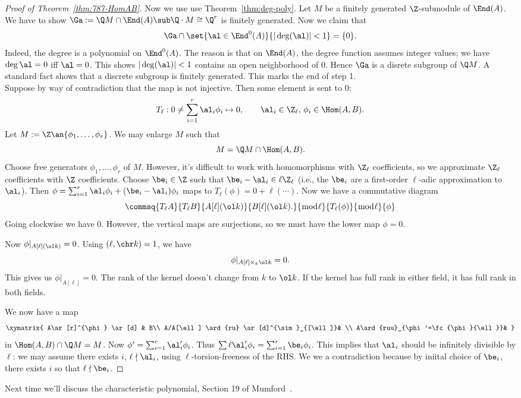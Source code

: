 \begin{proof}[Proof of Theorem~\ref{thm:787-HomAB}]
Now we use use Theorem~\ref{thm:deg-poly}. Let $M$ be a finitely generated $\Z$-submodule of $\End(A)$.  We have to show $\Ga:=\Q M\cap \End (A)\sub \Q\cdot M\cong \Q^r$ is finitely generated. Now we claim that 
\[
\Ga\cap \set{\al\in \End^0(A)}{|\deg(\al)|<1}=\{0\}.
\]
Indeed, the degree is a polynomial on $\End^0(A)$. The reason is that on $\End(A)$, the degree function assumes integer values; %
we have $\deg \al=0$ iff $\al=0$. This shows $|\deg(\al)|<1$ contains an open neighborhood of 0. Hence $\Ga$ is a disrete subgroup of $\Q M$. A standard fact shows that a discrete subgroup is finitely generated. This marks the end of step 1.\\

 Suppose by way of contradiction that the map is not injective. Then some element is sent to 0:
\[
T_{\ell}:0\ne \sum_{i=1}^r \al_i\phi_i \mapsto 0,\qquad \al_i\in \Z_{\ell}, \,\phi_i\in\Hom(A,B).
\]
Let $M:=\Z\an{\phi_1,\ldots, \phi_r}$. We may enlarge $M$ such that 
\[
M=\Q M\cap \Hom(A,B). 
\]
Choose free generators $\phi_1,\ldots, \phi_r$ of $M$. However, it's difficult to work with homomorphisms with $\Z_{\ell}$ coefficients, so we approximate $\Z_{\ell}$ coefficients with $\Z$ coefficients. Choose $\be_i\in \Z$ such that $\be_i-\al_i\in \ell\Z_{\ell}$ (i.e., the $\be_i$ are a first-order $\ell$-adic approximation to $\al_i$). Then $\phi=\sum_{i=1}^r \al_i\phi_i+(\be_i-\al_i)\phi_i$ maps to $T_{\ell}(\phi)=0+\ell(\cdots)$. Now we have a commutative diagram
\[
\commsq{T_{\ell}A}{T_{\ell}B}{A[\ell](\ol k)}{B[\ell](\ol k).}{\bmod{\ell}}{T_{\ell}(\phi)}{\bmod{\ell}}{\phi}
\]
Going clockwise we have 0. However, the vertical maps are surjections, so we must have the lower map $\phi=0$.

Now $\phi|_{A[\ell](\ol k)} =0$. Using $(\ell,\chr k)=1$, we have
\[
\phi|_{A[\ell]\times_k\ol k}=0.
\]
This gives us $\phi|_{A[\ell]}=0$. The rank of the kernel doesn't change from $k$ to $\ol k$. If the kernel has full rank in either field, it has full rank in both fields.

We now have a map
\[
\xymatrix{
A\ar[r]^{\phi} \ar[d] & B\\
A/A[\ell] \ard{ru} \ar[d]^{\sim}_{[\ell]}& \\
A\ard{ruu}_{\phi'=\fc{\phi}{\ell}}&
}
\] 
in $\Hom(A,B)\cap \Q M=M$. Now $\phi'=\sum_{i=1}^r \al_i'\phi_i$. Thus $\sum \ell \al_i' \phi_i=\sum_{i=1}^r \be_i \phi_i$. This implies that $\al_i$ should be infinitely divisible by $\ell$: we may assume there exists $i$, $\ell\nmid \al_i$, using $\ell$-torsion-freeness of the RHS.  
We we a contradiction because by iniital choice of $\be_i$, there exists $i$ so that $\ell\nmid \be_i$. 
\end{proof}
Next time we'll discuss the characteristic polynomial, Section 19 of Mumford~\cite{Mu70}.
